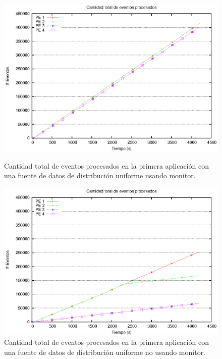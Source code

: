 \begin{figure}[ht]
\centering

\begin{minipage}[c]{0.45\textwidth}
\centering
    \includegraphics[width=\textwidth]{images/exp/app1/uniform/cm/eventCount.eps}
    \caption{Cantidad total de eventos procesados en la primera aplicación con una fuente de datos de distribución uniforme usando monitor.}
    \label{fig:app1-uniform-eventCount-cm}
\end{minipage} \hspace*{1cm}
\begin{minipage}[c]{0.45\textwidth}
\centering
    \includegraphics[width=\textwidth]{images/exp/app1/uniform/sm/eventCount.eps}
    \caption{Cantidad total de eventos procesados en la primera aplicación con una fuente de datos de distribución uniforme no usando monitor.}
    \label{fig:app1-uniform-eventCount-sm}
\end{minipage}

\end{figure}